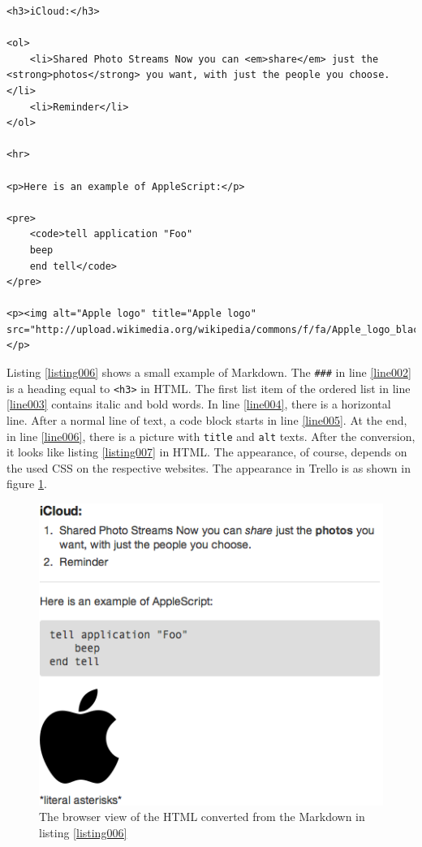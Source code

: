 \begin{lstlisting}[aboveskip=1\baselineskip, style=html, caption=Listing \ref{listing006} converted to HTML., label=listing007]
<h3>iCloud:</h3>

<ol>
	<li>Shared Photo Streams Now you can <em>share</em> just the <strong>photos</strong> you want, with just the people you choose.</li>
	<li>Reminder</li>
</ol>

<hr>

<p>Here is an example of AppleScript:</p>

<pre>
	<code>tell application "Foo"
	beep
	end tell</code>
</pre>

<p><img alt="Apple logo" title="Apple logo" src="http://upload.wikimedia.org/wikipedia/commons/f/fa/Apple_logo_black.svg"></p>
\end{lstlisting} 

Listing \ref{listing006} shows a small example of Markdown. The \lstinline{###} in line \ref{line002} is a heading equal to \lstinline{<h3>} in HTML. The first list item of the ordered list in line \ref{line003} contains italic and bold words. In line \ref{line004}, there is a horizontal line. After a normal line of text, a code block starts in line \ref{line005}. At the end, in line \ref{line006}, there is a picture with \lstinline{title} and \lstinline{alt} texts. After the conversion, it looks like listing \ref{listing007} in HTML. The appearance, of course, depends on the used CSS on the respective websites. The appearance in Trello is as shown in figure \ref{fig:markdown-result}.

\begin{figure}[htb]
\centering
\includegraphics[scale=0.6]{figures/markdown-result}
\caption{The browser view of the HTML converted from the Markdown in listing \ref{listing006}}
\label{fig:markdown-result}
\end{figure}

